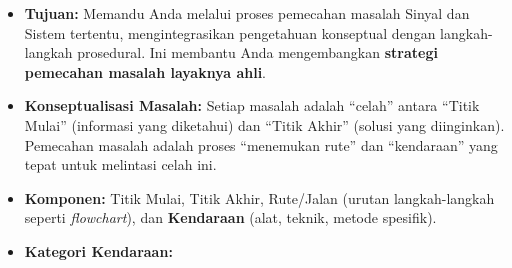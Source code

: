 \documentclass[
  letterpaper,
  DIV=11,
  numbers=noendperiod]{scrreprt}
\providecommand{\tightlist}{%
  \setlength{\itemsep}{0pt}\setlength{\parskip}{0pt}}
\begin{document}
\begin{enumerate}
\begin{itemize}
    \begin{itemize}
    \tightlist
    \item
      \textbf{Tujuan:} Memandu Anda melalui proses pemecahan masalah
      Sinyal dan Sistem tertentu, mengintegrasikan pengetahuan
      konseptual dengan langkah-langkah prosedural. Ini membantu Anda
      mengembangkan \textbf{strategi pemecahan masalah layaknya ahli}.
    \item
      \textbf{Konseptualisasi Masalah:} Setiap masalah adalah ``celah''
      antara ``Titik Mulai'' (informasi yang diketahui) dan ``Titik
      Akhir'' (solusi yang diinginkan). Pemecahan masalah adalah proses
      ``menemukan rute'' dan ``kendaraan'' yang tepat untuk melintasi
      celah ini.
    \item
      \textbf{Komponen:} Titik Mulai, Titik Akhir, Rute/Jalan (urutan
      langkah-langkah seperti \emph{flowchart}), dan \textbf{Kendaraan}
      (alat, teknik, metode spesifik).
    \item
      \textbf{Kategori Kendaraan:}


\end{itemize}
\end{itemize}
\end{enumerate}
\end{document}
